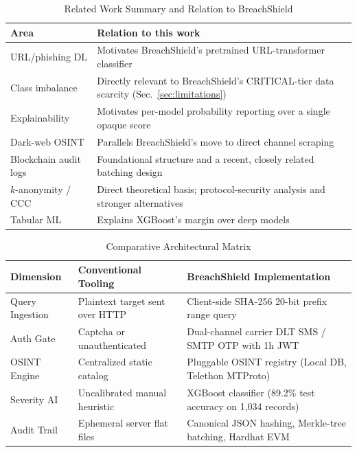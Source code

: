 \documentclass[conference]{IEEEtran}
\begin{document}
\begin{table}[htbp]
\caption{Related Work Summary and Relation to BreachShield}
\label{tab:relwork}
\centering
\scriptsize
\begin{tabular}{lp{5.2cm}}
\toprule
\textbf{Area} & \textbf{Relation to this work} \\
\midrule
URL/phishing DL \cite{aljofey2020effective,sahingoz2024dephides} & Motivates BreachShield's pretrained URL-transformer classifier \\
Class imbalance \cite{alsubaei2024enhancing} & Directly relevant to BreachShield's CRITICAL-tier data scarcity (Sec.~\ref{sec:limitations}) \\
Explainability \cite{pavani2024enhancing,tawfik2025explainable} & Motivates per-model probability reporting over a single opaque score \\
Dark-web OSINT \cite{kuhn2024navigating} & Parallels BreachShield's move to direct channel scraping \\
Blockchain audit logs \cite{arabnouri2024secure,merkle1988digital,crosby2009efficient} & Foundational structure and a recent, closely related batching design \\
$k$-anonymity / CCC \cite{sweeney2002k,elemam2008protecting,li2019protocols} & Direct theoretical basis; protocol-security analysis and stronger alternatives \\
Tabular ML \cite{chen2016xgboost,grinsztajn2022why} & Explains XGBoost's margin over deep models \\
\bottomrule
\end{tabular}
\end{table}

\begin{table}[htbp]
\caption{Comparative Architectural Matrix}
\label{tab:comparison}
\centering
\scriptsize
\begin{tabular}{lp{3.0cm}p{3.2cm}}
\toprule
\textbf{Dimension} & \textbf{Conventional Tooling} & \textbf{BreachShield Implementation} \\
\midrule
Query Ingestion & Plaintext target sent over HTTP & Client-side SHA-256 20-bit prefix range query \\
Auth Gate & Captcha or unauthenticated & Dual-channel carrier DLT SMS / SMTP OTP with 1h JWT \\
OSINT Engine & Centralized static catalog & Pluggable OSINT registry (Local DB, Telethon MTProto) \\
Severity AI & Uncalibrated manual heuristic & XGBoost classifier (89.2\% test accuracy on 1,034 records) \\
Audit Trail & Ephemeral server flat files & Canonical JSON hashing, Merkle-tree batching, Hardhat EVM \\
\bottomrule
\end{tabular}
\end{table}
\end{document}
